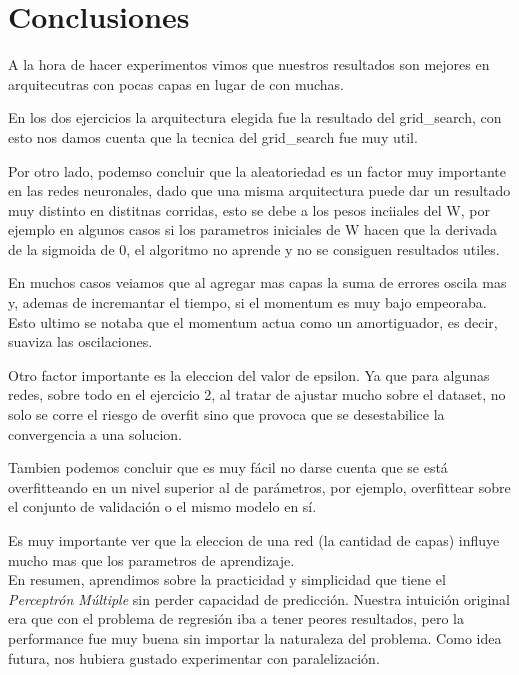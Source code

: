\section{Conclusiones}
A la hora de hacer experimentos vimos que nuestros resultados son mejores en arquitecutras con pocas capas en lugar de con muchas.

En los dos ejercicios la arquitectura elegida fue la resultado del grid\_search, con esto nos damos cuenta que la tecnica del grid\_search fue muy util.

Por otro lado, podemso concluir que la aleatoriedad es un factor muy importante en las redes neuronales, dado que una misma arquitectura puede dar un resultado muy distinto en distitnas corridas, esto se debe a los pesos inciiales del W, por ejemplo en algunos casos si los parametros iniciales de W hacen que la derivada de la sigmoida de 0, el algoritmo no aprende y no se consiguen resultados utiles.

En muchos casos veiamos que al agregar mas capas la suma de errores oscila mas y, ademas de incremantar el tiempo, si el momentum es muy bajo empeoraba. Esto ultimo se notaba que el momentum actua como un amortiguador, es decir, suaviza las oscilaciones.

Otro factor importante es la eleccion del valor de epsilon. Ya que para algunas redes, sobre todo en el ejercicio 2, al tratar de ajustar mucho sobre el dataset, no solo se corre el riesgo de overfit sino que provoca que se desestabilice la convergencia a una solucion.

Tambien podemos concluir que es muy fácil no darse cuenta que se está overfitteando en un nivel superior al de parámetros, por ejemplo, overfittear sobre el conjunto de validación o el mismo modelo en sí.

Es muy importante ver que la eleccion de una red (la cantidad de capas) influye mucho mas que los parametros de aprendizaje.\\

En resumen, aprendimos sobre la practicidad y simplicidad que tiene el \textit{Perceptrón Múltiple} sin perder capacidad de predicción. Nuestra intuición original era que con el problema de regresión iba a tener peores resultados, pero la performance fue muy buena sin importar la naturaleza del problema. Como idea futura, nos hubiera gustado experimentar con paralelización.
